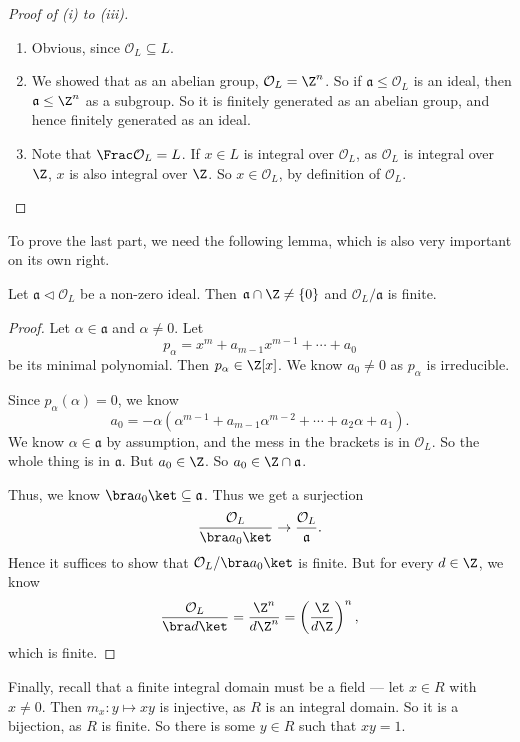 \documentclass[a4paper]{article}
\begin{document}
\begin{proof}[Proof of (i) to (iii)]\leavevmode
  \begin{enumerate}
    \item Obvious, since $\mathcal{O}_L \subseteq L$.
    \item We showed that as an abelian group, $\mathcal{O}_L = \Z^n$. So if $\mathfrak{a} \leq \mathcal{O}_L$ is an ideal, then $\mathfrak{a} \leq \Z^n$ as a subgroup. So it is finitely generated as an abelian group, and hence finitely generated as an ideal.
    \item Note that $\Frac \mathcal{O}_L = L$. If $x \in L$ is integral over $\mathcal{O}_L$, as $\mathcal{O}_L$ is integral over $\Z$, $x$ is also integral over $\Z$. So $x \in \mathcal{O}_L$, by definition of $\mathcal{O}_L$.
  \end{enumerate}
\end{proof}

To prove the last part, we need the following lemma, which is also very important on its own right.
\begin{lemma}
  Let $\mathfrak{a}\lhd \mathcal{O}_L$ be a non-zero ideal. Then $\mathfrak{a} \cap \Z \not= \{0\}$ and $\mathcal{O}_L/\mathfrak{a}$ is finite.
\end{lemma}

\begin{proof}
  Let $\alpha \in \mathfrak{a}$ and $\alpha \not= 0$. Let
  \[
    p_\alpha = x^m + a_{m - 1}x^{m - 1} + \cdots + a_0
  \]
  be its minimal polynomial. Then $p_\alpha \in \Z[x]$. We know $a_0 \not= 0$ as $p_\alpha$ is irreducible.

  Since $p_\alpha(\alpha) = 0$, we know
  \[
    a_0 = -\alpha(\alpha^{m - 1} + a_{m - 1} \alpha^{m - 2} + \cdots + a_2 \alpha + a_1).
  \]
  We know $\alpha \in \mathfrak{a}$ by assumption, and the mess in the brackets is in $\mathcal{O}_L$. So the whole thing is in $\mathfrak{a}$. But $a_0 \in \Z$. So $a_0 \in \Z \cap \mathfrak{a}$.

  Thus, we know $\bra a_0\ket \subseteq \mathfrak{a}$. Thus we get a surjection
  \[
    \frac{\mathcal{O}_L}{\bra a_0\ket} \rightarrow \frac{\mathcal{O}_L}{\mathfrak{a}}.
  \]
  Hence it suffices to show that $\mathcal{O}_L/\bra a_0\ket$ is finite. But for every $d \in \Z$, we know
  \[
    \frac{\mathcal{O}_L}{\bra d\ket} = \frac{\Z^n}{d\Z^n} = \left(\frac{\Z}{d\Z}\right)^n,
  \]
  which is finite.
\end{proof}

Finally, recall that a finite integral domain must be a field --- let $x \in R$ with $x \not= 0$. Then $m_x: y \mapsto xy$ is injective, as $R$ is an integral domain. So it is a bijection, as $R$ is finite. So there is some $y \in R$ such that $xy = 1$.
\end{document}
